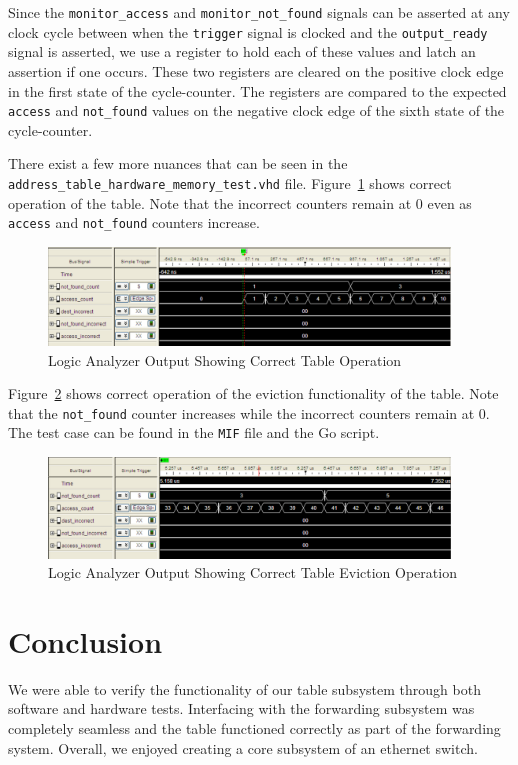 \documentclass{article}
\begin{document}
Since the \texttt{monitor\_access} and \texttt{monitor\_not\_found} signals can be asserted at any clock cycle between when the \texttt{trigger} signal is clocked and the \texttt{output\_ready} signal is asserted, we use a register to hold each of these values and latch an assertion if one occurs. These two registers are cleared on the positive clock edge in the first state of the cycle-counter. The registers are compared to the expected \texttt{access} and \texttt{not\_found} values on the negative clock edge of the sixth state of the cycle-counter.

There exist a few more nuances that can be seen in the \texttt{address\_table\_hardware\_memory\_test.vhd} file. Figure~\ref{fig:hardware_1} shows correct operation of the table. Note that the incorrect counters remain at 0 even as \texttt{access} and \texttt{not\_found} counters increase.

\begin{figure}[ht!]
  \centering
  	\includegraphics[width=0.95\textwidth]{hardware_1.PNG}
  \caption{Logic Analyzer Output Showing Correct Table Operation}
  \label{fig:hardware_1}
\end{figure}

Figure~\ref{fig:hardware_2} shows correct operation of the eviction functionality of the table. Note that the \texttt{not\_found} counter increases while the incorrect counters remain at 0. The test case can be found in the \texttt{MIF} file and the Go script.

\begin{figure}[ht!]
  \centering
  	\includegraphics[width=0.95\textwidth]{hardware_2.PNG}
  \caption{Logic Analyzer Output Showing Correct Table Eviction Operation}
  \label{fig:hardware_2}
\end{figure}

\section{Conclusion}

We were able to verify the functionality of our table subsystem through both software and hardware tests. Interfacing with the forwarding subsystem was completely seamless and the table functioned correctly as part of the forwarding system. Overall, we enjoyed creating a core subsystem of an ethernet switch.
\end{document}
